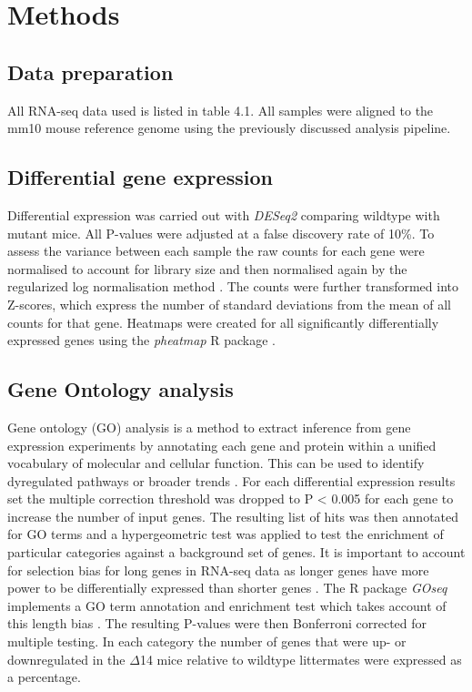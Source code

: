 \section{Methods}

\subsection{Data preparation}
All RNA-seq data used is listed in table 4.1. All samples were aligned to the mm10 mouse reference genome using the previously discussed analysis pipeline.

\subsection{Differential gene expression}
Differential expression was carried out with \textit{DESeq2} \citep{Love2014} comparing wildtype with mutant mice. All P-values were adjusted at a false discovery rate of 10\%. To assess the variance between each sample the raw counts for each gene were normalised to account for library size and then normalised again by the regularized log normalisation method \citep{Love2014}. The counts were further transformed into Z-scores, which express the number of standard deviations from the mean of all counts for that gene. Heatmaps were created for all significantly differentially expressed genes using the \textit{pheatmap} R package \citep{Kolde2012}.  

\subsection{Gene Ontology analysis}
Gene ontology (GO) analysis is a method to extract inference from gene expression experiments by annotating each gene and protein within a unified vocabulary of molecular and cellular function. This can be used to identify dyregulated pathways or broader trends \citep{Ashburner2000}. For each differential expression results set the multiple correction threshold was dropped to P < 0.005 for each gene to increase the number of input genes. The resulting list of hits was then annotated for GO terms and a hypergeometric test was applied to test the enrichment of particular categories against a background set of genes. It is important to account for selection bias for long genes in RNA-seq data as longer genes have more power to be differentially expressed than shorter genes \citep{Young2010}. The R package \textit{GOseq} implements a GO term annotation and enrichment test which takes account of this length bias \citep{Young2010}. The resulting P-values were then Bonferroni corrected for multiple testing. In each category the number of genes that were up- or downregulated in the $\Delta$14 mice relative to wildtype littermates were expressed as a percentage. 

